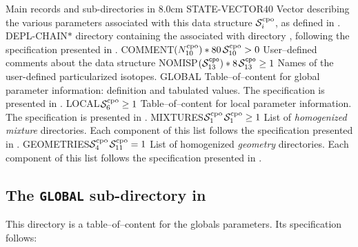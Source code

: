 \begin{DescriptionEnregistrement}{Main records and sub-directories in }{8.0cm}
\IntEnr
  {STATE-VECTOR}{$40$}
  {Vector describing the various parameters associated with this data structure $\mathcal{S}^{\rm cpo}_{i}$,
  as defined in .}
\OptDirEnr
  {DEPL-CHAIN}{$*$}
  {directory containing the  associated with directory , following
  the specification presented in .}
\OptCharEnr
  {COMMENT}{$(N^{\rm cpo}_{10})*80$}{$\mathcal{S}^{\rm cpo}_{10}> 0$}
  {User--defined comments about the data structure}
\OptCharEnr
  {NOMISP}{$(\mathcal{S}^{\tt cpo}_{13})*8$}{$\mathcal{S}^{\tt cpo}_{13}\ge 1$}
  {Names of the user-defined particularized isotopes.}
\DirEnr
  {GLOBAL}
  {Table--of--content for global parameter information: definition and tabulated values. The specification is presented in .}
\OptDirEnr
  {LOCAL}{$\mathcal{S}^{\rm cpo}_{6}\ge 1$}
  {Table--of--content for local parameter information. The specification is presented in .}
\OptDirlEnr
  {MIXTURES}{$\mathcal{S}^{\rm cpo}_1$}{$\mathcal{S}^{\rm cpo}_{1}\ge 1$}
  {List of {\sl homogenized mixture} directories. Each component of this list follows the specification
   presented in .}
\OptDirlEnr
  {GEOMETRIES}{$\mathcal{S}^{\rm cpo}_4$}{$\mathcal{S}^{\rm cpo}_{11} = 1$}
  {List of homogenized {\sl geometry} directories. Each component of this list follows the specification
   presented in .}
\end{DescriptionEnregistrement}

\subsection{The {\tt GLOBAL} sub-directory in }\label{sect:cpodirarbre}

This directory is a table--of--content for the globals parameters. Its
specification follows:

